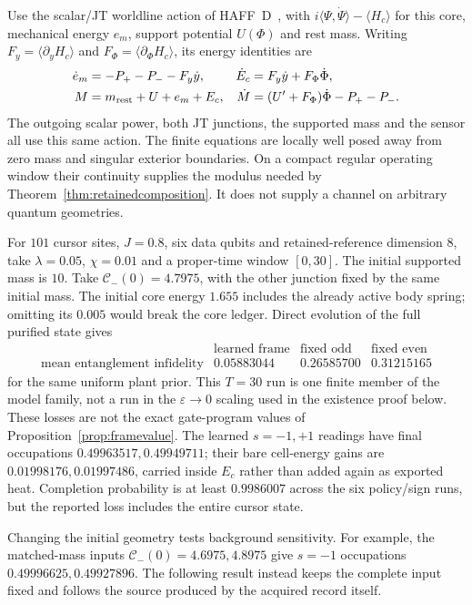 \documentclass[12pt]{article}
\theoremstyle{definition}
\theoremstyle{remark}
\begin{document}
Use the scalar/JT worldline action of HAFF~D~\cite{HAFFD}, with
$i\langle\Psi,\dot\Psi\rangle-\langle H_c\rangle$ for this core,
mechanical energy $e_m$, support potential $U(\Phi)$ and rest mass.
Writing $F_y=\langle\partial_y H_c\rangle$ and
$F_\Phi=\langle\partial_\Phi H_c\rangle$, its energy identities are
\begin{align}
 \dot e_m&=-P_+-P_--F_y\dot y,&
 \dot E_c&=F_y\dot y+F_\Phi\dot\Phi,\nonumber\\
 M&=m_{\rm rest}+U+e_m+E_c,&
 \dot M&=(U'+F_\Phi)\dot\Phi-P_+-P_-.
 \label{eq:retainedward}
\end{align}
The outgoing scalar power, both JT junctions, the supported mass and
the sensor all use this same action. The finite equations are locally
well posed away from zero mass and singular exterior boundaries.
On a compact regular operating window their continuity supplies the
modulus needed by Theorem~\ref{thm:retainedcomposition}.
It does not supply a channel on arbitrary quantum geometries.

For $101$ cursor sites, $J=0.8$, six data qubits and retained-reference
dimension $8$, take $\lambda=0.05$, $\chi=0.01$ and a proper-time
window $[0,30]$. The initial supported mass is $10$.
Take $\mathcal C_-(0)=4.7975$, with the other junction fixed by
the same initial mass. The initial core energy $1.655$ includes the already active body
spring; omitting its $0.005$ would break the core ledger.
Direct evolution of the full purified state gives
\[
\begin{array}{c|ccc}
 &\text{learned frame}&\text{fixed odd}&\text{fixed even}\\\hline
\text{mean entanglement infidelity}
 &0.05883044&0.26585700&0.31215165
\end{array}
\]
for the same uniform plant prior. This $T=30$ run is one finite member
of the model family, not a run in the $\varepsilon\to0$ scaling used
in the existence proof below. These losses are not the exact gate-program
values of Proposition~\ref{prop:framevalue}.
The learned $s=-1,+1$ readings have final occupations
$0.49963517,0.49949711$; their bare cell-energy gains are
$0.01998176,0.01997486$, carried inside $E_c$ rather than
added again as exported heat. Completion probability is at least
$0.9986007$ across the six policy/sign runs, but the reported loss includes
the entire cursor state.

Changing the initial geometry tests background sensitivity. For example,
the matched-mass inputs $\mathcal C_-(0)=4.6975,4.8975$ give
$s=-1$ occupations $0.49996625,0.49927896$.
The following result instead keeps the complete input fixed and follows
the source produced by the acquired record itself.
\end{document}
